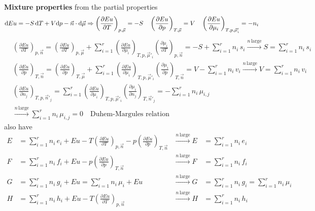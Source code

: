 \begin{thm}
    \textbf{Mixture properties} from the partial properties
    \begin{equation*}
        {\rm d}Eu = -S\,{\rm d}T + V{\rm d}p - \vec{n} \cdot {\rm d}\vec{\mu} \Rightarrow 
        \left(\frac{\partial Eu}{\partial T}\right)_{p,\vec{\mu}} = -S \quad
        \left(\frac{\partial Eu}{\partial p}\right)_{T,\vec{\mu}} = V \quad
        \left(\frac{\partial Eu}{\partial \mu_i}\right)_{T,p,\vec{\mu}'_i} = -n_i
    \end{equation*}
    \begin{align*}
        &\left(\frac{\partial E u}{\partial T}\right)_{p,\vec{n}} = 
        \left(\frac{\partial E u}{\partial T}\right)_{p,\vec{\mu}} + 
        \sum_{i=1}^r \left(\frac{\partial E u}{\partial \mu_i}\right)_{T,p,\vec{\mu}'_i} 
        \left(\frac{\partial \mu_i}{\partial T}\right)_{p,\vec{n}} = -S + \sum_{i=1}^r n_i \, s_i
        \xrightarrow{n \, \text{large}} S = \sum_{i=1}^r n_i \, s_i \\
        &\left(\frac{\partial E u}{\partial p}\right)_{T,\vec{n}} = 
        \left(\frac{\partial E u}{\partial p}\right)_{T,\vec{\mu}} + 
        \sum_{i=1}^r \left(\frac{\partial E u}{\partial \mu_i}\right)_{T,p,\vec{\mu}'_i} 
        \left(\frac{\partial \mu_i}{\partial p}\right)_{T,\vec{n}} = V - \sum_{i=1}^r n_i \, v_i
        \xrightarrow{n \, \text{large}} V = \sum_{i=1}^r n_i \, v_i \\
        &\left(\frac{\partial E u}{\partial n_j}\right)_{T,p,\vec{n}'_j} = 
        \sum_{i=1}^r \left(\frac{\partial E u}{\partial \mu_i}\right)_{T,p,\vec{\mu}'_i} 
        \left(\frac{\partial \mu_i}{\partial n_j}\right)_{T,\vec{n}'_j} = -\sum_{i=1}^r n_i \, \mu_{i,j}\\
        &\xrightarrow{n \, \text{large}} \sum_{i=1}^r n_i \, \mu_{i,j} = 0
        \quad \boxed{\text{Duhem-Margules relation}}
    \end{align*}
    also have
    \begin{align*}
        E &= \sum_{i=1}^r n_i \, e_i + E u - T \left( \frac{\partial E u}{\partial T} \right)_{p,\vec{n}} 
        - p \left( \frac{\partial E u}{\partial p} \right)_{T,\vec{n}} 
        &\xrightarrow{n \, \text{large}}E &= \sum_{i=1}^r n_i \, e_i \\
        F &= \sum_{i=1}^r n_i \, f_i + E u - p \left( \frac{\partial E u}{\partial p} \right)_{T,\vec{n}} 
        &\xrightarrow{n \, \text{large}}F &= \sum_{i=1}^r n_i \, f_i \\
        G &= \sum_{i=1}^r n_i \, g_i + E u = \sum_{i=1}^r n_i \, \mu_i + E u 
        &\xrightarrow{n \, \text{large}}G &= \sum_{i=1}^r n_i \, g_i = \sum_{i=1}^r n_i \, \mu_i \\
        H &= \sum_{i=1}^r n_i \, h_i + E u - T \left( \frac{\partial E u}{\partial T} \right)_{p,\vec{n}} 
        &\xrightarrow{n \, \text{large}}H &= \sum_{i=1}^r n_i \, h_i
    \end{align*}
\end{thm}
